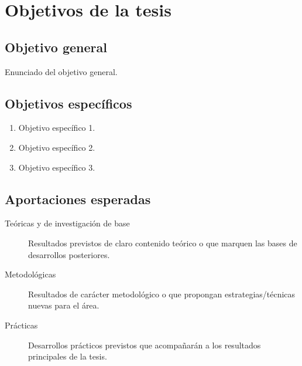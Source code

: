 \section{Objetivos de la tesis}
\label{sec:objetivos}


\subsection{Objetivo general}
Enunciado del objetivo general.

\subsection{Objetivos específicos}
\begin{enumerate}[label=O\arabic*.]
  \item Objetivo específico 1.
  \item Objetivo específico 2.
  \item Objetivo específico 3.
\end{enumerate}

\subsection{Aportaciones esperadas}

\begin{description}
  \item[Teóricas y de investigación de base] Resultados previstos de
    claro contenido teórico o que marquen las bases de desarrollos
    posteriores.
  \item[Metodológicas] Resultados de carácter metodológico o que
    propongan estrategias/técnicas nuevas para el área.
  \item[Prácticas] Desarrollos prácticos previstos que acompañarán a los
    resultados principales de la tesis.
\end{description}
